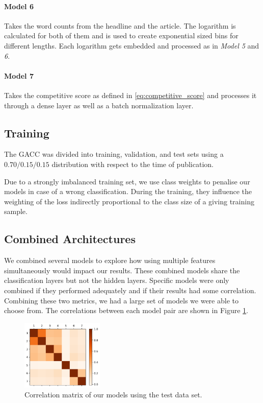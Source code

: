 \paragraph{Model 6} 
Takes the word counts from the headline and the article.
The logarithm is calculated for both of them and is used to create exponential sized bins for different lengths.
Each logarithm gets embedded and processed as in \textit{Model 5} and \textit{6}.

\paragraph{Model 7} 
Takes the competitive score as defined in \autoref{eq:competitive_score} and processes it through a dense layer as well as a batch normalization layer.

\subsection{Training}
The GACC was divided into training, validation, and test sets
using a $0.70/0.15/0.15$  distribution with respect to the time of publication.

Due to a strongly imbalanced training set, we use class weights to penalise our models in case of a wrong classification.
During the training, they influence the weighting of the loss indirectly proportional to the class size of a giving training sample.

\subsection{Combined Architectures}
We combined several models to explore how using multiple features simultaneously would impact our results.
These combined models share the classification layers but not the hidden layers.
Specific models were only combined if they performed adequately and if their results had some correlation.
Combining these two metrics, we had a large set of models we were able to choose from.
The correlations between each model pair are shown in Figure \ref{fig:correlation_matrix}. 

\begin{figure}[h]
	\includegraphics[width=0.35\textwidth]{fig/correlations.png}
	\caption{\textmd{Correlation matrix of our models using the test data set.}}
	\label{fig:correlation_matrix}
\end{figure}
